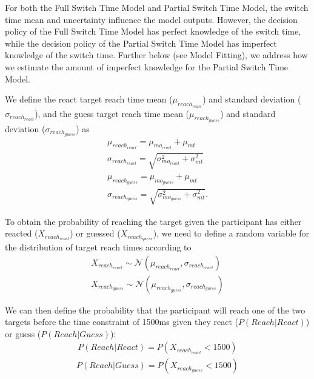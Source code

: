 \documentclass[12pt]{article}
\begin{document}
For both the Full Switch Time Model and Partial Switch Time Model, the switch time mean and uncertainty influence the model outputs. However, the decision policy of the Full Switch Time Model has perfect knowledge of the switch time, while the decision policy of the Partial Switch Time Model has imperfect knowledge of the switch time. Further below (see Model Fitting), we address how we estimate the amount of imperfect knowledge for the Partial Switch Time Model.

We define the react target reach time mean ($\mu_{reach_{react}}$) and standard deviation ($\sigma_{reach_{react}}$), and the  guess target reach time mean ($\mu_{reach_{guess}}$) and standard deviation ($\sigma_{reach_{guess}}$) as
\begin{align}
    \mu_{reach_{react}} =\mu_{mo_{react}} + \mu_{mt}                      \\
    \sigma_{reach_{react}} = \sqrt{\sigma_{mo_{react}}^2 + \sigma_{mt}^2} \\
    \mu_{reach_{guess}} =\mu_{mo_{guess}} + \mu_{mt}                      \\
    \sigma_{reach_{guess}} = \sqrt{\sigma_{mo_{guess}}^2 + \sigma_{mt}^2}.
\end{align}

To obtain the probability of reaching the target given the participant has either reacted ($X_{reach_{react}}$) or guessed ($X_{reach_{guess}}$), we need to define a random variable for the distribution of target reach times according to
\begin{align}
    X_{reach_{react}} \sim \mathcal{N}(\mu_{reach_{react}}, \sigma_{reach_{react}}) \\
    X_{reach_{guess}} \sim \mathcal{N}(\mu_{reach_{guess}}, \sigma_{reach_{guess}})
\end{align}

We can then define the probability that the participant will reach one of the two targets before the time constraint of 1500ms given they react ($P(Reach|React)$) or guess ($P(Reach|Guess)$):
\begin{align}
    P(Reach|React) = P(X_{reach_{react}} < 1500)
\end{align}
\begin{align}
    P(Reach|Guess) = P(X_{reach_{guess}} < 1500)
\end{align}
\end{document}
